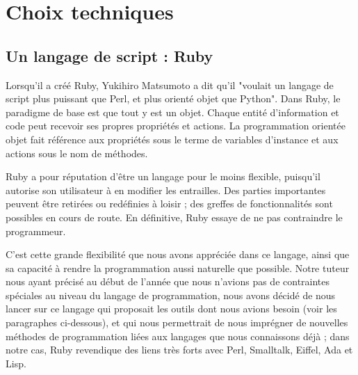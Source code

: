 \documentclass[10pt,a4paper]{article}
\begin{document}
\section{Choix techniques}
\subsection{Un langage de script : Ruby}
\par Lorsqu'il a créé Ruby, Yukihiro Matsumoto a dit qu'il "voulait un langage de script plus puissant que Perl, et plus orienté objet que Python". Dans Ruby, le paradigme de base est que tout y est un objet. Chaque entité d’information et code peut recevoir ses propres propriétés et actions. La programmation orientée objet fait référence aux propriétés sous le terme de variables d’instance et aux actions sous le nom de méthodes.
\par Ruby a pour réputation d’être un langage pour le moins flexible, puisqu’il autorise son utilisateur à en modifier les entrailles. Des parties importantes peuvent être retirées ou redéfinies à loisir ; des greffes de fonctionnalités sont possibles en cours de route. En définitive, Ruby essaye de ne pas contraindre le programmeur.
\par C'est cette grande flexibilité que nous avons appréciée dans ce langage, ainsi que sa capacité à rendre la programmation aussi naturelle que possible. Notre tuteur nous ayant précisé au début de l'année que nous n'avions pas de contraintes spéciales au niveau du langage de programmation, nous avons décidé de nous lancer sur ce langage qui proposait les outils dont nous avions besoin (voir les paragraphes ci-dessous), et qui nous permettrait de nous imprégner de nouvelles méthodes de programmation liées aux langages que nous connaissons déjà ; dans notre cas, Ruby revendique des liens très forts avec Perl, Smalltalk, Eiffel, Ada et Lisp.%
\end{document}
